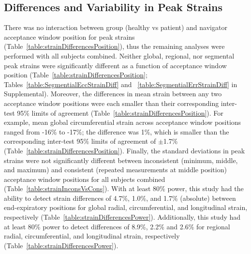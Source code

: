 \subsection{Differences and Variability in Peak Strains}
	There was no interaction between group (healthy vs patient) and navigator acceptance window position for peak strains (Table~\ref{table:strainDifferencesPosition}), thus the remaining analyses were performed with all subjects combined. Neither global, regional, nor segmental peak strains were significantly different as a function of acceptance window position (Table~\ref{table:strainDifferencesPosition}; Tables~\ref{table:SegmentialEccStrainDiff} and ~\ref{table:SegmentialErrStrainDiff} in Supplemental). Moreover, the differences in mean strain between any two acceptance window positions were each smaller than their corresponding inter-test 95\% limits of agreement (Table~\ref{table:strainDifferencesPosition}). For example, mean global circumferential strain across acceptance window positions ranged from -16\% to -17\%; the difference was 1\%, which is smaller than the corresponding inter-test 95\% limits of agreement of $\pm$1.7\% (Table~\ref{table:strainDifferencesPosition}). Finally, the standard deviations in peak strains were not significantly different between inconsistent (minimum, middle, and maximum) and consistent (repeated measurements at middle position) acceptance window positions for all subjects combined (Table~\ref{table:strainInconsVsCons}). With at least 80\% power, this study had the ability to detect strain differences of 4.7\%, 1.0\%, and 1.7\% (absolute) between end-expiratory positions for global radial, circumferential, and longitudinal strain, respectively (Table~\ref{table:strainDifferencesPower}). Additionally, this study had at least 80\% power to detect differences of 8.9\%, 2.2\% and 2.6\% for regional radial, circumferential, and longitudinal strain, respectively (Table~\ref{table:strainDifferencesPower}).
	
